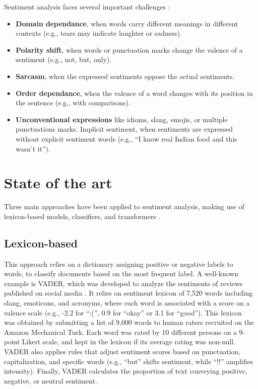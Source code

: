 \documentclass{article}
\begin{document}
Sentiment analysis faces several important challenges \citep{kumar_comprehensive_2023}:
\begin{itemize}
    \item \textbf{Domain dependance}, when words carry different meanings in different contexts (e.g., tears may indicate laughter or sadness).
    \item \textbf{Polarity shift}, when words or punctuation marks change the valence of a sentiment (e.g., not, but, only).
    \item \textbf{Sarcasm}, when the expressed sentiments oppose the actual sentiments.
    \item \textbf{Order dependance}, when the valence of a word changes with its position in the sentence (e.g., with comparisons).
    \item \textbf{Unconventional expressions} like idioms, slang, emojis, or multiple punctuations marks.
Implicit sentiment, when sentiments are expressed without explicit sentiment words (e.g., \enquote{I know real Indian food and this wasn’t it}).
\end{itemize}


\section{State of the art}

Three main approaches have been applied to sentiment analysis, making use of lexicon-based models, classifiers, and transformers \citep{hartmann_more_2023}.

\subsection{Lexicon-based}

This approach relies on a dictionary assigning positive or negative labels to words, to classify documents based on the most frequent label. A well-known example is VADER, which was developed to analyze the sentiments of reviews published on social media \citep{hutto_vader_2014}. It relies on sentiment lexicon of 7,520 words including slang, emoticons, and acronyms, where each word is associated with a score on a valence scale (e.g., -2.2 for \enquote{:(}, 0.9 for \enquote{okay} or 3.1 for \enquote{good}). This lexicon was obtained by submitting a list of 9,000 words to human raters recruited on the Amazon Mechanical Turk. Each word was rated by 10 different persons on a 9-point Likert scale, and kept in the lexicon if its average rating was non-null. VADER also applies rules that adjust sentiment scores based on punctuation, capitalization, and specific words (e.g., \enquote{but} shifts sentiment, while \enquote{!!} amplifies intensity). Finally, VADER calculates the proportion of text conveying positive, negative, or neutral sentiment.
\end{document}
